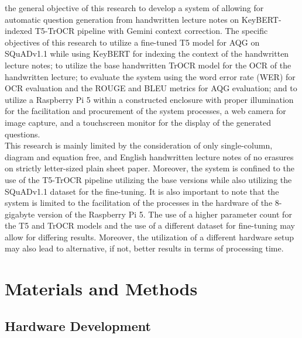 \documentclass[conference]{IEEEtran}
\begin{document}
the general objective of this research to develop a system of allowing for
automatic question generation from handwritten lecture notes on KeyBERT-indexed 
T5-TrOCR pipeline with Gemini context correction. The specific objectives of
this research to utilize a fine-tuned T5 model for AQG on SQuADv1.1 while 
using KeyBERT for indexing the context of the handwritten lecture notes; to 
utilize the base handwritten TrOCR model for the OCR of the handwritten lecture;
to evaluate the system using the word error rate (WER) for OCR evaluation and
the ROUGE and BLEU metrics for AQG evaluation; and to utilize a Raspberry Pi 5
within a constructed enclosure with proper illumination for the 
facilitation and procurement of the system processes, a web camera for image
capture, and a touchscreen monitor for the display of the generated questions.
\\ 
\indent This research is mainly limited by the consideration of only 
single-column, diagram and equation free, and English handwritten lecture notes 
of no erasures on strictly letter-sized plain sheet paper.
Moreover, the system is confined to the 
use of the T5-TrOCR pipeline utilizing the base versions while 
also utilizing the SQuADv1.1 dataset for the fine-tuning. It is also important 
to note that the system is limited to the facilitation of the processes in 
the hardware of the 8-gigabyte version of the Raspberry Pi 5. The use of 
a higher parameter count for the T5 and TrOCR models and the use of a different 
dataset for fine-tuning may allow for differing results. Moreover, the 
utilization of a different hardware setup may also lead to alternative, if not, 
better results in terms of processing time. 


\section{Materials and Methods}
    \subsection{Hardware Development}
\end{document}
